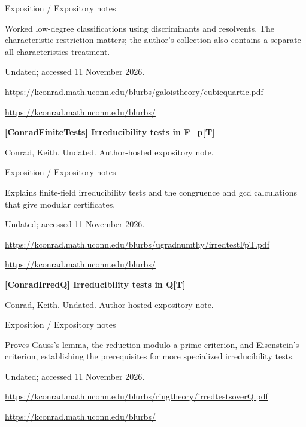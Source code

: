 \documentclass[11pt,a4paper,oneside,openany]{book}
\begin{document}
{\small\sffamily\color{atlasgold}Exposition / Expository notes}\par
\color{black} Worked low-degree classifications using discriminants and resolvents. The characteristic restriction matters; the author's collection also contains a separate all-characteristics treatment.\par
{\small Undated; accessed 11 November 2026.}\par
{\footnotesize\url{https://kconrad.math.uconn.edu/blurbs/galoistheory/cubicquartic.pdf}}\par
{\footnotesize\url{https://kconrad.math.uconn.edu/blurbs/}}\par
\vspace{9pt}
\hypertarget{ref:ConradFiniteTests}{}
{\sffamily\bfseries\color{atlasgreen}[ConradFiniteTests] Irreducibility tests in F\_\allowbreak{}p[T]}\par
\color{black} Conrad, Keith. Undated. Author-hosted expository note.\par
{\small\sffamily\color{atlasgold}Exposition / Expository notes}\par
\color{black} Explains finite-field irreducibility tests and the congruence and gcd calculations that give modular certificates.\par
{\small Undated; accessed 11 November 2026.}\par
{\footnotesize\url{https://kconrad.math.uconn.edu/blurbs/ugradnumthy/irredtestFpT.pdf}}\par
{\footnotesize\url{https://kconrad.math.uconn.edu/blurbs/}}\par
\vspace{9pt}
\hypertarget{ref:ConradIrredQ}{}
{\sffamily\bfseries\color{atlasgreen}[ConradIrredQ] Irreducibility tests in Q[T]}\par
\color{black} Conrad, Keith. Undated. Author-hosted expository note.\par
{\small\sffamily\color{atlasgold}Exposition / Expository notes}\par
\color{black} Proves Gauss's lemma, the reduction-modulo-a-prime criterion, and Eisenstein's criterion, establishing the prerequisites for more specialized irreducibility tests.\par
{\small Undated; accessed 11 November 2026.}\par
{\footnotesize\url{https://kconrad.math.uconn.edu/blurbs/ringtheory/irredtestsoverQ.pdf}}\par
{\footnotesize\url{https://kconrad.math.uconn.edu/blurbs/}}\par
\end{document}
